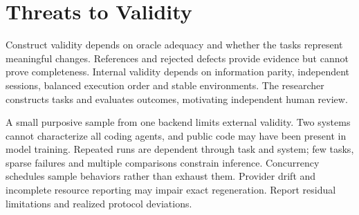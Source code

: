 \section{Threats to Validity}
Construct validity depends on oracle adequacy and whether the tasks represent meaningful changes.
References and rejected defects provide evidence but cannot prove completeness. Internal validity
depends on information parity, independent sessions, balanced execution order and stable environments.
The researcher constructs tasks and evaluates outcomes, motivating independent human review.

A small purposive sample from one backend limits external validity. Two systems cannot characterize
all coding agents, and public code may have been present in model training. Repeated runs are dependent
through task and system; few tasks, sparse failures and multiple comparisons constrain inference.
Concurrency schedules sample behaviors rather than exhaust them. Provider drift and incomplete resource
reporting may impair exact regeneration. Report residual limitations and realized protocol deviations.
